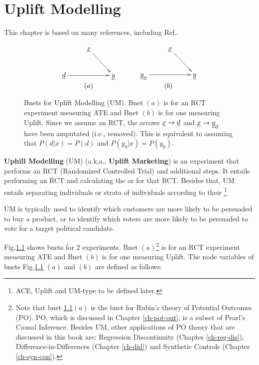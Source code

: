 \chapter{Uplift Modelling}
\label{ch-uplift}



This chapter is based 
on 
many references,
including Ref.\cite{uplift-2017, fei, wiki-uplift,jaros}.

\begin{figure}[h!]
$$\begin{array}{ccc}
\xymatrix{
&\rvx\ar[dr]
\\
\rvd\ar[rr]
&&\rvy
}
&\quad&
\xymatrix{
&\rvx\ar[dr]
\\
\rvy_0\ar[rr]
&&\rvy
}
\\
(a) &\quad & (b)
\end{array}
$$
\caption{Bnets for Uplift Modelling (UM). 
Bnet $(a)$ is for an RCT experiment measuring ATE and Bnet $(b)$ is for one measuring Uplift. 
 Since we assume an RCT, the arrows $\rvx\rarrow \rvd$ 
and $\rvx\rarrow \rvy_0$ have been amputated (i.e., removed). This is equivalent to assuming that $P(d|x)=P(d)$ and
$P(y_0|x)=P(y_0)$.
}
\label{fig-up-bnet}
\end{figure}



{\bf Uphill Modelling} (UM) (a.k.a., {\bf Uplift Marketing})
is an experiment that performs an
RCT (Randomized Controlled Trial) and additional steps. It 
entails performing an
RCT  and 
 calculating  the  or  for that  RCT.
 Besides that, UM entails 
separating 
individuals or strata of individuals according to their \footnote{ACE, Uplift and UM-type to be defined later.}

UM is typically used to identify which 
customers are more likely to be persuaded to buy a
product, or to identify which voters are more
likely to be persuaded to vote for a target political candidate.


Fig.\ref{fig-up-bnet} shows bnets for 2 experiments. Bnet $(a)$\footnote{
Note that bnet \ref{fig-up-bnet}$(a)$ 
is the bnet for Rubin's theory of 
Potential Outcomes (PO).
PO, which is
discussed in Chapter \ref{ch-pot-out},
 is a subset
of Pearl's Causal Inference.
Besides UM, other  applications of PO theory
that are discussed in this book 
are: Regression Discontinuity (Chapter \ref{ch-reg-dis}),
Difference-in-Differences (Chapter \ref{ch-did})
and Synthetic Controls (Chapter \ref{ch-syn-con}).} is for an RCT experiment measuring ATE and Bnet $(b)$ is for one measuring Uplift. 
The node variables of bnets Fig.\ref{fig-up-bnet}
$(a)$ and $(b)$
are defined as follows:

